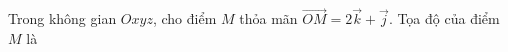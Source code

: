 \begin{ex}
Trong không gian $Oxyz$, cho điểm $M$ thỏa mãn $\overrightarrow{OM}=2\vec k+\vec j$. Tọa độ của điểm $M$ là
\end{ex}
